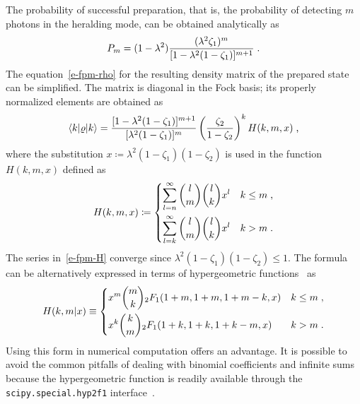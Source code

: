 \documentclass{article}
\begin{document}
The probability of successful preparation, that is, the probability of detecting $m$ photons in the heralding mode, can be obtained analytically as
%
\begin{equation}\label{e-fpm-pro}
  P_{m} = (1 - \lambda^{2}) 
  \frac
    { (\lambda^{2} \zeta_{1})^{m} }
    { [ 1 - \lambda^{2} (1 - \zeta_{1}) ]^{m + 1} } \;\text{.}
\end{equation}
%
The equation~\eqref{e-fpm-rho} for the resulting density matrix of the prepared state can be simplified. The matrix is diagonal in the Fock basis; its properly normalized elements are obtained as
%
\begin{equation}\label{e-fpm-rho-el}
  \braket{ k | \varrho | k } =
  \frac
    { [ 1 - \lambda^{2} (1 - \zeta_{1}) ]^{m + 1} }
    { [ \lambda^{2} (1 - \zeta_{1}) ]^{m} }
  \left( \frac{ \zeta_{2} }{ 1 - \zeta_{2} } \right)^{k}
  H (k, m, x) \;\text{,}
\end{equation}
%
where the substitution ${x \coloneqq \lambda^{2} ( 1 - \zeta_{1} )(1 - \zeta_{2} )}$ is used in the function $H(k, m, x)$ defined as
%
\begin{equation}\label{e-fpm-H}
  H(k, m, x) \coloneq
  \begin{dcases}
    \sum_{l = n}^{\infty}
      \binom{l}{m}
      \binom{l}{k}
      x^{l} 
    & k \leq m \;\text{,} \\
    \sum_{l = k}^{\infty}
      \binom{l}{m}
      \binom{l}{k}
      x^{l}
    & k > m \;\text{.}
  \end{dcases}
\end{equation}
%
The series in~\eqref{e-fpm-H} converge since ${\lambda^{2} ( 1 - \zeta_{1} )(1 - \zeta_{2} ) \leq 1}$. The formula can be alternatively expressed in terms of hypergeometric functions~\cite{bateman1981} as
%
\begin{equation}
  H(k, m \vert x) \equiv
  \begin{dcases}
    x^{m} \binom{m}{k} {}_{2}F_{1} (1 + m, 1 + m, 1 + m - k, x)
    & k \leq m \;\text{,} \\
    x^{k} \binom{k}{m} {}_{2}F_{1} (1 + k, 1 + k, 1 + k - m, x)
    & k > m \;\text{.}
  \end{dcases}
\end{equation}
%
Using this form in numerical computation offers an advantage. It is possible to avoid the common pitfalls of dealing with binomial coefficients and infinite sums because the hypergeometric function is readily available through the \verb|scipy.special.hyp2f1| interface~\cite{virtanen2020}.

%
%
\end{document}
